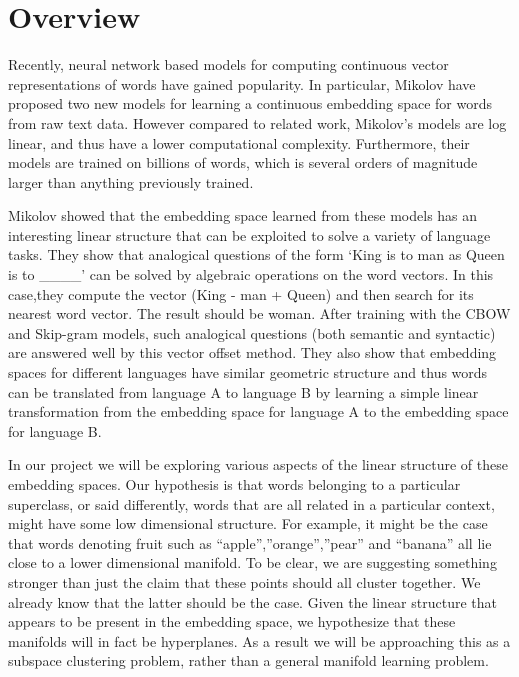 \section{Overview}\label{sec:overview}

Recently, neural network based models for computing continuous vector representations of words have gained popularity. 
In particular, Mikolov \etal \cite{mikolov1, mikolov2} have proposed two new models for learning a continuous embedding space for words from raw text data. 
However compared to related work\cite{bengio,mikolov5}, Mikolov’s models are log linear, and thus have a lower computational complexity. 
Furthermore, their models are trained on billions of words, which is several orders of magnitude larger than anything previously trained.
 
Mikolov \etal \cite{mikolov3} showed that the embedding space learned from these models has an interesting linear structure that can be exploited to solve a variety of language tasks. 
They show that analogical questions of the form `King is to man as Queen is to \_\_\_\_' can be solved by algebraic operations on the word vectors. 
In this case,they compute the vector (King - man + Queen) and then search for its nearest word vector. 
The result should be woman. 
After training with the CBOW and Skip-gram models, such analogical questions (both semantic and syntactic) are answered well by this vector offset method. 
They also show that embedding spaces for different languages have similar geometric structure and thus words can be translated from language A to language B by learning a simple linear transformation from the embedding space for language A to the embedding space for language B.
 
In our project we will be exploring various aspects of the linear structure of these embedding spaces. 
Our hypothesis is that words belonging to a particular superclass, or said differently, words that are all related in a particular context, might have some low dimensional structure. 
For example, it might be the case that words denoting fruit such as “apple”,”orange”,”pear” and “banana” all lie close to a lower dimensional manifold. 
To be clear, we are suggesting something stronger than just the claim that these points should all cluster together. 
We already know that the latter should be the case. 
Given the linear structure that appears to be present in the embedding space, we hypothesize that these manifolds will in fact be hyperplanes. 
As a result we will be approaching this as a subspace clustering problem, rather than a general manifold learning problem.
